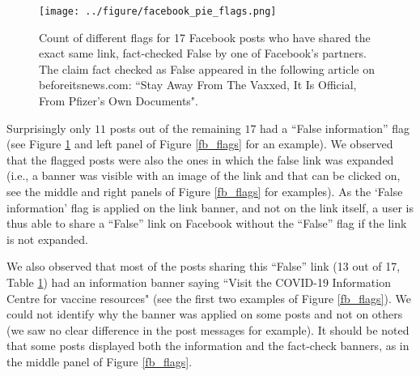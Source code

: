 \documentclass{article}
\begin{document}

\begin{figure}[h]
\centering
\texttt{[image: ../figure/facebook\_pie\_flags.png]}
\caption{Count of different flags for 17 Facebook posts who have shared the exact same link, fact-checked False by one of Facebook’s partners. The claim fact checked as False appeared in the following article on beforeitsnews.com:  ``Stay Away From The Vaxxed, It Is Official, From Pfizer’s Own Documents". }
\label{tab_flags_fb}
\end{figure}

\smallskip

Surprisingly only $11$ posts out of the remaining $17$ had a ``False information'' flag  (see Figure \ref{tab_flags_fb} and left panel of Figure \ref{fb_flags} for an example). We observed that the flagged posts were also the ones in which the false link was expanded (i.e., a banner was visible with an image of the link and that can be clicked on, see the middle and right panels of Figure \ref{fb_flags} for examples). As the ‘False information’ flag is applied on the link banner, and not on the link itself, a user is thus able to share a ``False'' link on Facebook without the ``False'' flag if the link is not expanded.

\smallskip

We also observed that most of the posts sharing this ``False'' link (13 out of 17, Table \ref{tab_flags_fb}) had an information banner saying ``Visit the COVID-19 Information Centre for vaccine resources" (see the first two examples of Figure \ref{fb_flags}). We could not identify why the banner was applied on some posts and not on others (we saw no clear difference in the post messages for example). It should be noted that some posts displayed both the information and the fact-check banners, as in the middle panel of Figure \ref{fb_flags}.
\end{document}
